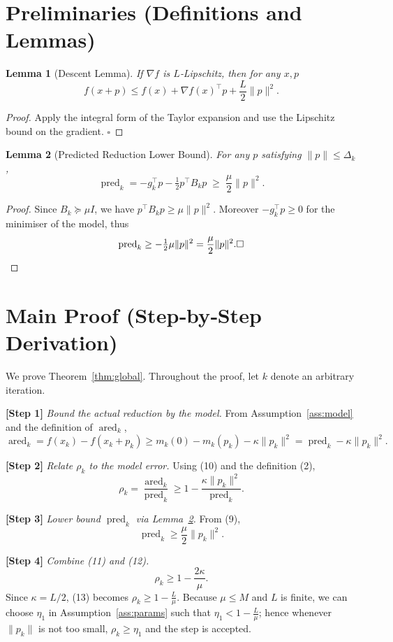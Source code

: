 \documentclass{article}
\newtheorem{lemma}{Lemma}
\begin{document}
\section*{Preliminaries (Definitions and Lemmas)}
\begin{lemma}[Descent Lemma]\label{lem:descent}
If $\nabla f$ is $L$‑Lipschitz, then for any $x,p$
\[
f(x+p)\le f(x)+\nabla f(x)^{\top}p+\frac{L}{2}\|p\|^{2}.
\tag{8}
\]
\end{lemma}
\begin{proof}
Apply the integral form of the Taylor expansion and use the Lipschitz bound
on the gradient. \hfill $\square$
\end{proof}
\begin{lemma}[Predicted Reduction Lower Bound]\label{lem:pred}
For any $p$ satisfying $\|p\|\le\Delta_{k}$,
\[
\operatorname{pred}_{k}= -g_{k}^{\top}p-\tfrac12 p^{\top}B_{k}p
\;\ge\;
\frac{\mu}{2}\|p\|^{2}.
\tag{9}
\]
\end{lemma}
\begin{proof}
Since $B_{k}\succeq\mu I$, we have $p^{\top}B_{k}p\ge\mu\|p\|^{2}$.
Moreover $-g_{k}^{\top}p\ge0$ for the minimiser of the model, thus
\[
\operatorname{pred}_{k}\ge -\tfrac12\mu\|p\|^{2}
= \frac{\mu}{2}\|p\|^{2}. \hfill\square
\]
\end{proof}

\section*{Main Proof (Step‑by‑Step Derivation)}
We prove Theorem~\ref{thm:global}.  Throughout the proof, let $k$ denote an
arbitrary iteration.

\noindent\textbf{[Step 1]} \emph{Bound the actual reduction by the model.}
From Assumption~\ref{ass:model} and the definition of $\operatorname{ared}_{k}$,
\[
\operatorname{ared}_{k}=f(x_{k})-f(x_{k}+p_{k})
\ge m_{k}(0)-m_{k}(p_{k})-\kappa\|p_{k}\|^{2}
= \operatorname{pred}_{k}-\kappa\|p_{k}\|^{2}.
\tag{10}
\]

\noindent\textbf{[Step 2]} \emph{Relate $\rho_{k}$ to the model error.}
Using (10) and the definition (2),
\[
\rho_{k}
= \frac{\operatorname{ared}_{k}}{\operatorname{pred}_{k}}
\ge 1-\frac{\kappa\|p_{k}\|^{2}}{\operatorname{pred}_{k}}.
\tag{11}
\]

\noindent\textbf{[Step 3]} \emph{Lower bound $\operatorname{pred}_{k}$ via Lemma~\ref{lem:pred}.}
From (9),
\[
\operatorname{pred}_{k}\ge\frac{\mu}{2}\|p_{k}\|^{2}.
\tag{12}
\]

\noindent\textbf{[Step 4]} \emph{Combine (11) and (12).}
\[
\rho_{k}\ge 1-\frac{2\kappa}{\mu}.
\tag{13}
\]
Since $\kappa=L/2$, (13) becomes $\rho_{k}\ge 1-\frac{L}{\mu}$.
Because $\mu\le M$ and $L$ is finite, we can choose $\eta_{1}$ in
Assumption~\ref{ass:params} such that $\eta_{1}<1-\frac{L}{\mu}$; hence whenever
$\|p_{k}\|$ is not too small, $\rho_{k}\ge\eta_{1}$ and the step is accepted.
\end{document}
